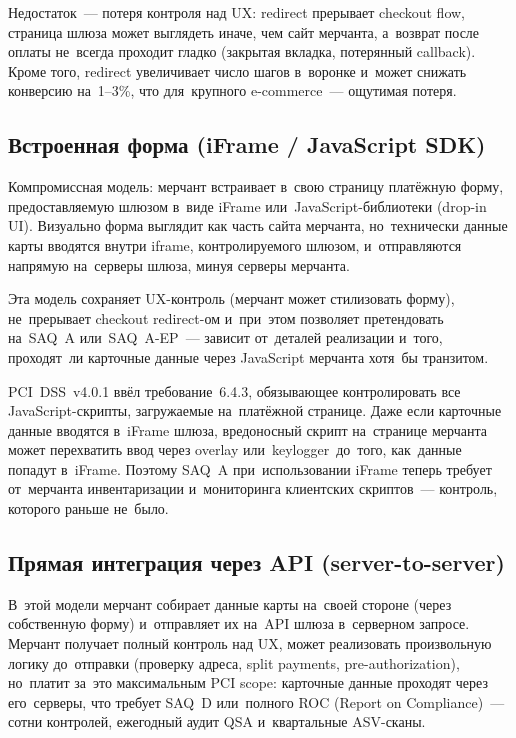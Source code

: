 Недостаток~--- потеря контроля над UX: redirect прерывает checkout
flow, страница шлюза может выглядеть иначе, чем сайт мерчанта,
а~возврат после оплаты не~всегда проходит гладко (закрытая вкладка,
потерянный callback). Кроме того, redirect увеличивает число шагов
в~воронке и~может снижать конверсию на~1--3\%, что для~крупного
e-commerce~--- ощутимая потеря.

\subsection*{Встроенная форма (iFrame / JavaScript SDK)}

Компромиссная модель: мерчант встраивает в~свою страницу
платёжную форму, предоставляемую шлюзом в~виде iFrame
или~JavaScript-библиотеки (drop-in UI). Визуально форма
выглядит как часть сайта мерчанта, но~технически данные карты
вводятся внутри iframe, контролируемого шлюзом, и~отправляются
напрямую на~серверы шлюза, минуя серверы мерчанта.

Эта модель сохраняет UX-контроль (мерчант может стилизовать
форму), не~прерывает checkout redirect-ом и~при~этом позволяет
претендовать на~SAQ~A или~SAQ~A-EP~--- зависит от~деталей
реализации и~того, проходят~ли карточные данные через
JavaScript мерчанта хотя~бы транзитом.

\begin{practice}
  PCI~DSS~v4.0.1 ввёл требование~6.4.3, обязывающее контролировать
  все JavaScript-скрипты, загружаемые на~платёжной странице.
  Даже если карточные данные вводятся в~iFrame шлюза, вредоносный
  скрипт на~странице мерчанта может перехватить ввод через overlay
  или~keylogger~до~того, как~данные попадут в~iFrame. Поэтому
  SAQ~A при~использовании iFrame теперь требует от~мерчанта
  инвентаризации и~мониторинга клиентских скриптов~---
  контроль, которого раньше не~было.
\end{practice}

\subsection*{Прямая интеграция через API (server-to-server)}

В~этой модели мерчант собирает данные карты на~своей стороне
(через собственную форму) и~отправляет их на~API шлюза
в~серверном запросе. Мерчант получает полный контроль над UX,
может реализовать произвольную логику до~отправки (проверку
адреса, split payments, pre-authorization), но~платит за~это
максимальным PCI scope: карточные данные проходят через его~серверы,
что требует SAQ~D или~полного ROC (Report on Compliance)~---
сотни контролей, ежегодный аудит QSA и~квартальные ASV-сканы.

